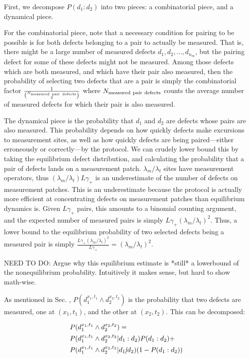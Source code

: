 \documentclass[twocolumn,superscriptaddress,aps,prb,floatfix]{revtex4-1}
\begin{document}
First, we decompose $P(d_1 : d_2)$ into two pieces: a combinatorial piece, and a dynamical piece.

For the combinatorial piece, note that a necessary condition for pairing to be possible is for both defects belonging to a pair to actually be measured.  That is, there might be a large number of measured defects ${d_1, d_2, ..., d_{n_m}}$, but the pairing defect for some of these defects might not be measured. Among those defects which are both measured, and which have their pair also measured, then the probability of selecting two defects that are a pair is simply the combinatorial factor $\frac{1}{\binom{N_{\rm{measured\ pair\ defects}}}{2}}$ where $N_{\rm{measured\ pair\ defects}}$ counts the average number of measured defects for which their pair is also measured.

The dynamical piece is the probability that $d_1$ and $d_2$ are defects whose pairs are also measured.  This probability depends on how quickly defects make excursions to measurement sites, as well as how quickly defects are being paired---either erroneously or correctly---by the protocol.  We can crudely lower bound this by taking the equilibrium defect distribution, and calculating the probability that a pair of defects lands on a measurement patch.  $\lambda_m / \lambda_t$ sites have measurement operators, thus $(\lambda_m / \lambda_t) L \gamma_+$ is an underestimate of the number of defects on measurement patches.  This is an underestimate because the protocol is actually more efficient at concentrating defects on measurement patches than equilibrium dynamics is.  Given $L \gamma_+$ pairs, this amounts to a binomial counting argument, and the expected number of measured pairs is simply $L \gamma_+ (\lambda_m / \lambda_t)^2$.  Thus, a lower bound to the equilibrium probability of two selected defects being a measured pair is simply $\frac{L \gamma_+(\lambda_m / \lambda_t)^2}{L \gamma_+} = (\lambda_m / \lambda_t)^2$.

NEED TO DO: Argue why this equilibrium estimate is *still* a lowerbound of the nonequilibrium probability.  Intuitively it makes sense, but hard to show math-wise.

As mentioned in Sec. \label{sec:bayes_prob_calc}, $P(d_1^{x_1,t_1}\wedge d_2^{x_2,t_2})$ is the probability that two defects are measured, one at $(x_1,t_1)$, and the other at $(x_2,t_2)$.  This can be decomposed:

\begin{align}
&P(d_1^{x_1,t_1}\wedge d_2^{x_2,t_2}) = \\ \notag
&P(d_1^{x_1,t_1} \wedge d_2^{x_2,t_2} | d_1:d_2) P(d_1 : d_2) + \\ \notag 
&P(d_1^{x_1,t_1} \wedge d_2^{x_2,t_2} | d_1\cancel{:}d_2) (1 - P(d_1 : d_2))
\end{align}
\end{document}
